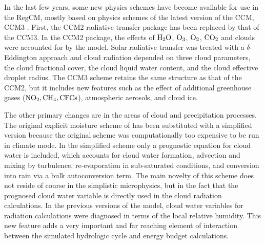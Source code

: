 In the last few years, some new physics schemes have become available for use in the \ac{RegCM}, mostly based on physics schemes of the latest version of the \ac{CCM}, \ac{CCM3} \citep{Kiehl_96}. First, the \ac{CCM2} radiative transfer package has been replaced by that of the \ac{CCM3}. In the \ac{CCM2} package, the effects of ${\rm H_2O}$, ${\rm O_3}$, ${\rm O_2}$, ${\rm CO_2}$ and clouds were accounted for by the model. Solar radiative transfer was treated with a $\delta$-Eddington approach and cloud radiation depended on three cloud parameters, the cloud fractional cover, the cloud liquid water content, and the cloud effective droplet radius. The \ac{CCM3} scheme retains the same structure as that of the \ac{CCM2}, but it includes new features such as the effect of additional greenhouse gases (${\rm NO_2, CH_4, CFCs}$), atmospheric aerosols, and cloud ice.
 
The other primary changes are in the areas of cloud and precipitation processes. The original explicit moisture scheme of \citet{Hsie_84} has been substituted with a simplified version because the original scheme was computationally too expensive to be run in climate mode. In the simplified scheme only a prognostic equation for cloud water is included, which accounts for cloud water formation, advection and mixing by turbulence, re-evaporation in sub-saturated conditions, and conversion into rain via a bulk autoconversion term. The main novelty of this scheme does not reside of course in the simplistic microphysics, but in the fact that the prognosed cloud water variable is directly used in the cloud radiation calculations. In the previous versions of the model, cloud water variables for radiation calculations were diagnosed in terms of the local relative humidity. This new feature adds a very important and far reaching element of interaction between the simulated hydrologic cycle and energy budget calculations. 



